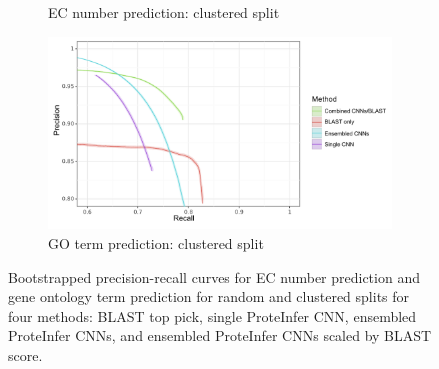 \begin{figure}[ht]
\begin{subfigure}[b]{0.5\linewidth}
    \caption{EC number prediction: clustered split} 
    \label{fig:with_ensemble:c} 
  \end{subfigure}%
  \begin{subfigure}[b]{0.5\linewidth}
    \centering
    \includegraphics[width=1\linewidth]{clustered_truncated_go.pdf}
    \caption{GO term prediction: clustered split} 
    \label{fig:with_ensemble:d} 
  \end{subfigure} 
  \caption{Bootstrapped precision-recall curves for EC number prediction and gene ontology term prediction for random and clustered splits for four methods: BLAST top pick, single ProteInfer CNN, ensembled ProteInfer CNNs, and ensembled ProteInfer CNNs scaled by BLAST score. }
  \label{fig:with_ensemble} 
\end{figure}



